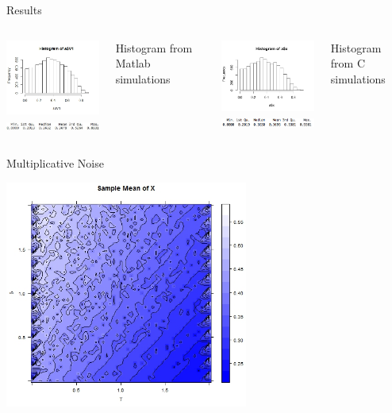 \begin{frame}{Results}
 

  \begin{columns}[t]
    \includegraphics[width=6cm]{img/shrimpHistMATLAB} \\
		\includegraphics[width=5.5cm]{img/histSummML}
    \begin{center} Histogram from Matlab simulations \end{center}
    \includegraphics[width=6cm]{img/Rplot} \\
		\includegraphics[width=5.5cm]{img/sumAMAN}
    \begin{center} Histogram from C simulations \end{center}
  \end{columns}
\end{frame}



\begin{frame}{Multiplicative Noise}
\begin{center} 
	\includegraphics[width=8cm]{img/RplotMultiNoiseContourX} 
\end{center}
\end{frame}

